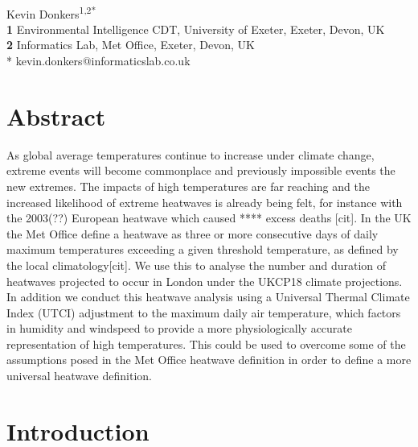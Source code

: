 \documentclass[10pt,letterpaper]{article}
\begin{document}
\vspace*{0.2in}

\begin{flushleft}
{\Large
\textbf{}}
\newline
\\
Kevin Donkers\textsuperscript{1,2*}
\\
\bigskip
\textbf{1} Environmental Intelligence CDT, University of Exeter, Exeter, Devon, UK
\\
\textbf{2} Informatics Lab, Met Office, Exeter, Devon, UK
\\
\bigskip
* kevin.donkers@informaticslab.co.uk
\end{flushleft}


\section*{Abstract}
As global average temperatures continue to increase under climate change, extreme events will become commonplace and previously impossible events the new extremes. The impacts of high temperatures  are far reaching and the increased likelihood of extreme heatwaves is already being felt, for instance with the 2003(??) European heatwave which caused **** excess deaths [cit]. In the UK the Met Office define a heatwave as three or more consecutive days of daily maximum temperatures exceeding a given threshold temperature, as defined by the local climatology[cit]. We use this to analyse the number and duration of heatwaves projected to occur in London under the UKCP18 climate projections. In addition we conduct this heatwave analysis using a Universal Thermal Climate Index (UTCI) adjustment to the maximum daily air temperature, which factors in humidity and windspeed to provide a more physiologically accurate representation of high temperatures. This could be used to overcome some of the assumptions posed in the Met Office heatwave definition in order to define a more universal heatwave definition.

\section*{Introduction}


\end{document}
